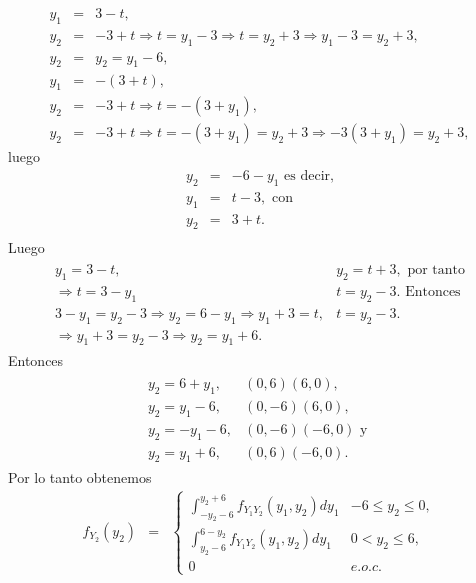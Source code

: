 \begin{Ejem}
\begin{eqnarray*}
y_{1}&=&3-t,\\
y_{2}&=& -3+t \Rightarrow t=y_{1}-3 \Rightarrow t=y_{2}+3 \Rightarrow y_{1}-3=y_{2}+3,\\
y_{2}&=&y_{2}=y_{1}-6,\\
y_{1}&=&-\left(3+t \right),\\
y_{2}&=& -3+t \Rightarrow t=-\left(3+y_{1} \right),\\ 
y_{2}&=&-3+t \Rightarrow t=-\left(3+y_{1} \right)= y_{2}+3\Rightarrow -3 \left(3+y_{1} \right)= y_{2}+3,
 \end{eqnarray*}
 luego
 \begin{eqnarray*}
 y_{2}&=&-6-y_{1}\textrm{ es decir,}\\
 y_{1}&=&t-3,\textrm{ con}\\
 y_{2}&=&3+t.\\
\end{eqnarray*}
Luego 
\begin{eqnarray*}
\begin{array}{ll}
y_{1}= 3-t, & y_{2}=t+3,\textrm{ por tanto}\\
\Rightarrow t=3-y_{1} & t= y_{2}-3.\textrm{ Entonces}\\
3-y_{1}=y_{2}-3 \Rightarrow y_{2}=6-y_{1} \Rightarrow y_{1}+3=t, & t=y_{2}-3.\\
\Rightarrow y_{1}+3= y_{2}-3 \Rightarrow y_{2}=y_{1}+6. & 
\end{array}
\end{eqnarray*}
Entonces
\begin{eqnarray*}
\begin{array}{cc}
y_{2}=6+y_{1}, & \left(0,6 \right)\left(6,0\right),\\
y_{2}=y_{1}-6, & \left(0,-6 \right)\left(6,0\right),\\
y_{2}=-y_{1}-6, & \left(0,-6 \right)\left(-6,0\right)\textrm{ y }\\
y_{2}=y_{1}+6, & \left(0,6 \right)\left(-6,0\right).
\end{array}
\end{eqnarray*}
Por lo tanto obtenemos
\begin{eqnarray*}
f_{Y_{2}} \left(y_{2}\right) &=& \begin{cases}
\int _{-y_{2}-6}^{y_{2}+6} f_{Y_{1}Y_{2}}\left(y_{1}, y_{2} \right)dy_{1} & -6\leq y_{2}\leq 0,\\
\int _{y_{2}-6}^{6-y_{2}} f_{Y_{1}Y_{2}}\left(y_{1}, y_{2} \right)dy_{1} & 0 < y_{2}\leq 6,\\  
0 & e.o.c.
\end{cases}\\

\end{eqnarray*}
\end{Ejem}
